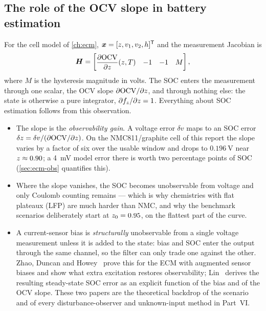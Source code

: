 \subsection{The role of the OCV slope in battery estimation}
\label{sec:prelim-ocvslope}
For the cell model of \cref{ch:ecm}, $\bm{x} = [z, v_1, v_2, h]^{\mathsf{T}}$ and the measurement Jacobian
is
\begin{equation}
\bm{H} = \begin{bmatrix}
 \dfrac{\partial\mathrm{OCV}}{\partial z}(z,T) & -1 & -1 & M
\end{bmatrix},
\label{eq:prelim-battery-H}
\end{equation}
where $M$ is the hysteresis magnitude in volts. The SOC enters the measurement through one
scalar, the OCV slope $\partial\mathrm{OCV}/\partial z$, and through nothing else: the state is
otherwise a pure integrator, $\partial f_z/\partial z = 1$. Everything about SOC estimation
follows from this observation.
\begin{itemize}[nosep,leftmargin=*]
\item The slope is the \emph{observability gain}. A voltage error $\delta v$ maps to an SOC
  error $\delta z = \delta v / (\partial\mathrm{OCV}/\partial z)$. On the NMC811/graphite cell of
  this report the slope varies by a factor of six over the usable window and drops to
  $\SI{0.196}{\volt}$ near $z\approx0.90$; a \SI{4}{\milli\volt} model error there is worth
  two percentage points of SOC (\cref{sec:ecm-obs} quantifies this).
\item Where the slope vanishes, the SOC becomes unobservable from voltage and only Coulomb
  counting remains --- which is why chemistries with flat plateaux (LFP) are much harder than
  NMC, and why the benchmark scenarios deliberately start at $z_0 = 0.95$, on the flattest
  part of the curve.
\item A current-sensor bias is \emph{structurally} unobservable from a single voltage
  measurement unless it is added to the state: bias and SOC enter the output through the same
  channel, so the filter can only trade one against the other. Zhao, Duncan and
  Howey~\cite{zhao2017observability} prove this for the ECM with augmented sensor biases and show
  what extra excitation restores observability; Lin~\cite{lin2018sensorbias} derives the
  resulting steady-state SOC error as an explicit function of the bias and of the OCV slope.
  These two papers are the theoretical backdrop of the  scenario and of every
  disturbance-observer and unknown-input method in Part~VI.
\end{itemize}

